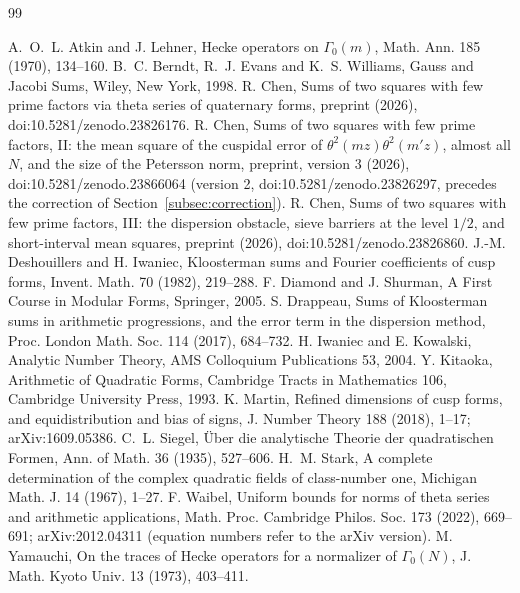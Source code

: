 \documentclass[11pt]{amsart}
\theoremstyle{remark}
\begin{document}
\begin{thebibliography}{99}\raggedright
{} A.~O.~L. Atkin and J. Lehner, Hecke operators on $\Gamma_0(m)$, Math. Ann. 185 (1970), 134--160.
 B.~C. Berndt, R.~J. Evans and K.~S. Williams, Gauss and Jacobi Sums, Wiley, New York, 1998.
 R. Chen, Sums of two squares with few prime factors via theta series of quaternary forms, preprint (2026), doi:10.5281/zenodo.23826176.
 R. Chen, Sums of two squares with few prime factors, II: the mean square of the cuspidal error of $\theta^2(mz)\theta^2(m'z)$, almost all $N$, and the size of the Petersson norm, preprint, version 3 (2026), doi:10.5281/zenodo.23866064 (version 2, doi:10.5281/zenodo.23826297, precedes the correction of Section~\ref{subsec:correction}).
 R. Chen, Sums of two squares with few prime factors, III: the dispersion obstacle, sieve barriers at the level $1/2$, and short-interval mean squares, preprint (2026), doi:10.5281/zenodo.23826860.
 J.-M. Deshouillers and H. Iwaniec, Kloosterman sums and Fourier coefficients of cusp forms, Invent. Math. 70 (1982), 219--288.
 F. Diamond and J. Shurman, A First Course in Modular Forms, Springer, 2005.
 S. Drappeau, Sums of Kloosterman sums in arithmetic progressions, and the error term in the dispersion method, Proc. London Math. Soc. 114 (2017), 684--732.
 H. Iwaniec and E. Kowalski, Analytic Number Theory, AMS Colloquium Publications 53, 2004.
 Y. Kitaoka, Arithmetic of Quadratic Forms, Cambridge Tracts in Mathematics 106, Cambridge University Press, 1993.
 K. Martin, Refined dimensions of cusp forms, and equidistribution and bias of signs, J. Number Theory 188 (2018), 1--17; arXiv:1609.05386.
 C.~L. Siegel, \"Uber die analytische Theorie der quadratischen Formen, Ann. of Math. 36 (1935), 527--606.
 H.~M. Stark, A complete determination of the complex quadratic fields of class-number one, Michigan Math. J. 14 (1967), 1--27.
 F. Waibel, Uniform bounds for norms of theta series and arithmetic applications, Math. Proc. Cambridge Philos. Soc. 173 (2022), 669--691; arXiv:2012.04311 (equation numbers refer to the arXiv version).
 M. Yamauchi, On the traces of Hecke operators for a normalizer of $\Gamma_0(N)$, J. Math. Kyoto Univ. 13 (1973), 403--411.
\end{thebibliography}
\end{document}

